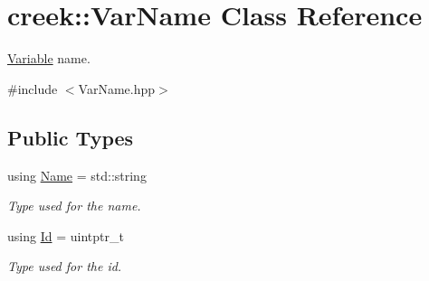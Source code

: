 \hypertarget{classcreek_1_1_var_name}{}\section{creek\+:\+:Var\+Name Class Reference}
\label{classcreek_1_1_var_name}


\hyperlink{classcreek_1_1_variable}{Variable} name.  




{\ttfamily \#include $<$Var\+Name.\+hpp$>$}

\subsection*{Public Types}
\begin{DoxyCompactItemize}
\item 
using \hyperlink{classcreek_1_1_var_name_a9d09406258e87f40bc1fea0cbf9c86cc}{Name} = std\+::string\hypertarget{classcreek_1_1_var_name_a9d09406258e87f40bc1fea0cbf9c86cc}{}\label{classcreek_1_1_var_name_a9d09406258e87f40bc1fea0cbf9c86cc}

\begin{DoxyCompactList}\small\item\em Type used for the name. \end{DoxyCompactList}\item 
using \hyperlink{classcreek_1_1_var_name_a8dcbc9cf867fbb7e2f8202132de8690d}{Id} = uintptr\+\_\+t\hypertarget{classcreek_1_1_var_name_a8dcbc9cf867fbb7e2f8202132de8690d}{}\label{classcreek_1_1_var_name_a8dcbc9cf867fbb7e2f8202132de8690d}

\begin{DoxyCompactList}\small\item\em Type used for the id. \end{DoxyCompactList}\end{DoxyCompactItemize}
